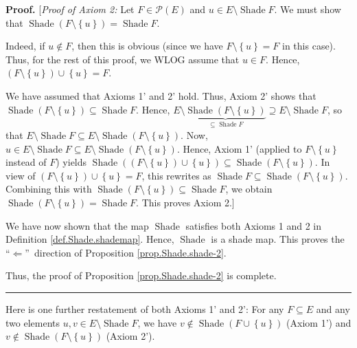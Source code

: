 \documentclass[numbers=enddot,12pt,final,onecolumn]{scrartcl}%
\theoremstyle{definition}
\newenvironment{proof}[1][Proof]{\noindent\textbf{#1.} }{\ \rule{0.5em}{0.5em}}
\newenvironment{verlong}{}{}
\begin{document}
\begin{verlong}
\begin{proof}
[\textit{Proof of Axiom 2:} Let $F\in\mathcal{P}\left(  E\right)  $ and $u\in
E\setminus\operatorname*{Shade}F$. We must show that $\operatorname*{Shade}%
\left(  F\setminus\left\{  u\right\}  \right)  =\operatorname*{Shade}F$.

Indeed, if $u\notin F$, then this is obvious (since we have $F\setminus
\left\{  u\right\}  =F$ in this case). Thus, for the rest of this proof, we
WLOG assume that $u\in F$. Hence, $\left(  F\setminus\left\{  u\right\}
\right)  \cup\left\{  u\right\}  =F$.

We have assumed that Axioms 1' and 2' hold. Thus, Axiom 2' shows that
$\operatorname*{Shade}\left(  F\setminus\left\{  u\right\}  \right)
\subseteq\operatorname*{Shade}F$. Hence, $E\setminus
\underbrace{\operatorname*{Shade}\left(  F\setminus\left\{  u\right\}
\right)  }_{\subseteq\operatorname*{Shade}F}\supseteq E\setminus
\operatorname*{Shade}F$, so that $E\setminus\operatorname*{Shade}F\subseteq
E\setminus\operatorname*{Shade}\left(  F\setminus\left\{  u\right\}  \right)
$. Now, $u\in E\setminus\operatorname*{Shade}F\subseteq E\setminus
\operatorname*{Shade}\left(  F\setminus\left\{  u\right\}  \right)  $. Hence,
Axiom 1' (applied to $F\setminus\left\{  u\right\}  $ instead of $F$) yields
$\operatorname*{Shade}\left(  \left(  F\setminus\left\{  u\right\}  \right)
\cup\left\{  u\right\}  \right)  \subseteq\operatorname*{Shade}\left(
F\setminus\left\{  u\right\}  \right)  $. In view of $\left(  F\setminus
\left\{  u\right\}  \right)  \cup\left\{  u\right\}  =F$, this rewrites as
$\operatorname*{Shade}F\subseteq\operatorname*{Shade}\left(  F\setminus
\left\{  u\right\}  \right)  $. Combining this with $\operatorname*{Shade}%
\left(  F\setminus\left\{  u\right\}  \right)  \subseteq\operatorname*{Shade}%
F$, we obtain $\operatorname*{Shade}\left(  F\setminus\left\{  u\right\}
\right)  =\operatorname*{Shade}F$. This proves Axiom 2.]

We have now shown that the map $\operatorname*{Shade}$ satisfies both Axioms 1
and 2 in Definition \ref{def.Shade.shademap}. Hence, $\operatorname*{Shade}$
is a shade map. This proves the \textquotedblleft$\Longleftarrow
$\textquotedblright\ direction of Proposition \ref{prop.Shade.shade-2}.

Thus, the proof of Proposition \ref{prop.Shade.shade-2} is complete.
\end{proof}
\end{verlong}

Here is one further restatement of both Axioms 1' and 2': For any $F\subseteq
E$ and any two elements $u,v\in E\setminus\operatorname*{Shade}F$, we have
$v\notin\operatorname*{Shade}\left(  F\cup\left\{  u\right\}  \right)  $
(Axiom 1') and $v\notin\operatorname*{Shade}\left(  F\setminus\left\{
u\right\}  \right)  $ (Axiom 2').
\end{document}
